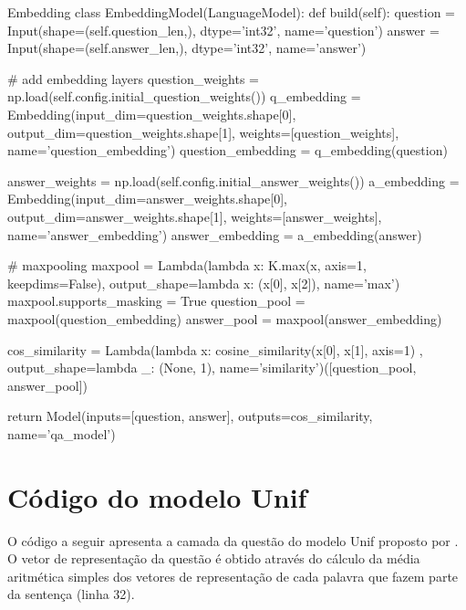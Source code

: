\begin{mypython-linenumber}{Embedding}
class EmbeddingModel(LanguageModel):
    def build(self):
        question = Input(shape=(self.question_len,), dtype='int32', name='question')
        answer = Input(shape=(self.answer_len,), dtype='int32', name='answer')

        # add embedding layers
        question_weights = np.load(self.config.initial_question_weights())
        q_embedding = Embedding(input_dim=question_weights.shape[0],
                                output_dim=question_weights.shape[1],
                                weights=[question_weights],
                                name='question_embedding')
        question_embedding = q_embedding(question)

        answer_weights = np.load(self.config.initial_answer_weights())
        a_embedding = Embedding(input_dim=answer_weights.shape[0],
                                output_dim=answer_weights.shape[1],
                                weights=[answer_weights],
                                name='answer_embedding')
        answer_embedding = a_embedding(answer)

        # maxpooling
        maxpool = Lambda(lambda x: K.max(x, axis=1, keepdims=False), output_shape=lambda x: (x[0], x[2]),
                         name='max')
        maxpool.supports_masking = True
        question_pool = maxpool(question_embedding)
        answer_pool = maxpool(answer_embedding)
        
        cos_similarity = Lambda(lambda x: cosine_similarity(x[0], x[1], axis=1)
                                       , output_shape=lambda _: (None, 1), name='similarity')([question_pool,
                                                                                               answer_pool])

        return Model(inputs=[question, answer], outputs=cos_similarity,
                                   name='qa_model')

\end{mypython-linenumber}

\vspace{2cm}

\section{Código do modelo Unif}

O código a seguir apresenta a camada da questão do modelo Unif proposto por \cite{cambronero-deep-learning-code-search:2019}. O vetor de representação da questão é obtido através do cálculo da média aritmética simples dos vetores de representação de cada palavra que fazem parte da sentença (linha 32).

